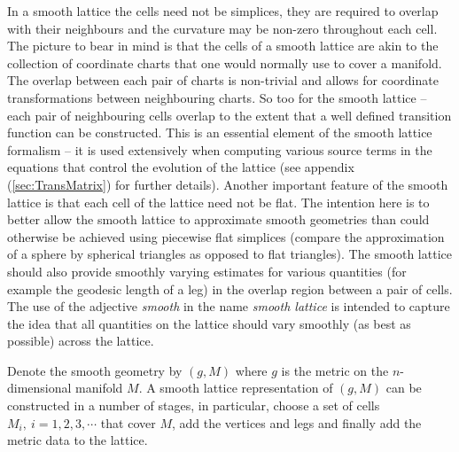 \documentclass[a4paper,12pt]{article}
\numberwithin{equation}{section}
\begin{document}
In a smooth lattice the cells need not be simplices, they are required to overlap with their
neighbours and the curvature may be non-zero throughout each cell. The picture to bear in
mind is that the cells of a smooth lattice are akin to the collection of coordinate charts
that one would normally use to cover a manifold. The overlap between each pair of charts is
non-trivial and allows for coordinate transformations between neighbouring charts. So too
for the smooth lattice -- each pair of neighbouring cells overlap to the extent that a well
defined transition function can be constructed. This is an essential element of the smooth
lattice formalism -- it is used extensively when computing various source terms in the
equations that control the evolution of the lattice (see appendix (\ref{sec:TransMatrix})
for further details). Another important feature of the smooth lattice is that each cell of
the lattice need not be flat. The intention here is to better allow the smooth lattice to
approximate smooth geometries than could otherwise be achieved using piecewise flat simplices
(compare the approximation of a sphere by spherical triangles as opposed to flat triangles).
The smooth lattice should also provide smoothly varying estimates for various quantities
(for example the geodesic length of a leg) in the overlap region between a pair of cells.
The use of the adjective \emph{smooth} in the name \emph{smooth lattice} is intended to
capture the idea that all quantities on the lattice should vary smoothly (as best as
possible) across the lattice.

Denote the smooth geometry by $(g,M)$ where $g$ is the metric on the $n$-dimensional
manifold $M$. A smooth lattice representation of $(g,M)$ can be constructed in a number of
stages, in particular, choose a set of cells $M_i,\>i=1,2,3,\cdots$ that cover $M$, add the
vertices and legs and finally add the metric data to the lattice.
\end{document}
